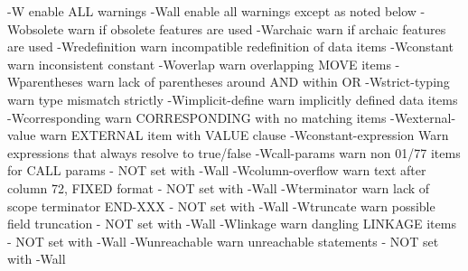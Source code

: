   -W                    enable ALL warnings
  -Wall                 enable all warnings except as noted below
  -Wobsolete            warn if obsolete features are used
  -Warchaic             warn if archaic features are used
  -Wredefinition        warn incompatible redefinition of data items
  -Wconstant            warn inconsistent constant
  -Woverlap             warn overlapping MOVE items
  -Wparentheses         warn lack of parentheses around AND within OR
  -Wstrict-typing       warn type mismatch strictly
  -Wimplicit-define     warn implicitly defined data items
  -Wcorresponding       warn CORRESPONDING with no matching items
  -Wexternal-value      warn EXTERNAL item with VALUE clause
  -Wconstant-expression Warn expressions that always resolve to true/false
  -Wcall-params         warn non 01/77 items for CALL params
			- NOT set with -Wall
  -Wcolumn-overflow     warn text after column 72, FIXED format
			- NOT set with -Wall
  -Wterminator          warn lack of scope terminator END-XXX
			- NOT set with -Wall
  -Wtruncate            warn possible field truncation
			- NOT set with -Wall
  -Wlinkage             warn dangling LINKAGE items
			- NOT set with -Wall
  -Wunreachable         warn unreachable statements
			- NOT set with -Wall

